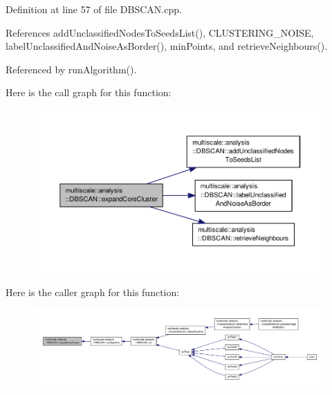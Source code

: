 Definition at line 57 of file D\-B\-S\-C\-A\-N.\-cpp.



References add\-Unclassified\-Nodes\-To\-Seeds\-List(), C\-L\-U\-S\-T\-E\-R\-I\-N\-G\-\_\-\-N\-O\-I\-S\-E, label\-Unclassified\-And\-Noise\-As\-Border(), min\-Points, and retrieve\-Neighbours().



Referenced by run\-Algorithm().



Here is the call graph for this function\-:
\nopagebreak
\begin{figure}[H]
\begin{center}
\leavevmode
\includegraphics[width=350pt]{classmultiscale_1_1analysis_1_1DBSCAN_a400c4e9fb1d9e9bafa970b33912a5ce1_cgraph}
\end{center}
\end{figure}




Here is the caller graph for this function\-:
\nopagebreak
\begin{figure}[H]
\begin{center}
\leavevmode
\includegraphics[width=350pt]{classmultiscale_1_1analysis_1_1DBSCAN_a400c4e9fb1d9e9bafa970b33912a5ce1_icgraph}
\end{center}
\end{figure}


